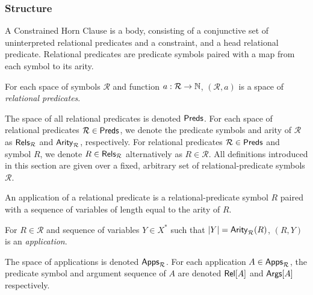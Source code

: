 \subsubsection{Structure}
A Constrained Horn Clause is a body, consisting of a conjunctive set
of uninterpreted relational predicates and a constraint, and a head
relational predicate.
%
Relational predicates are predicate symbols paired with a map from
each symbol to its arity.
%
\begin{defn}
  \label{defn:rel-preds}
  For each space of symbols $\mathcal{R}$ and function $a: \mathcal{R}
  \to \mathbb{N}$, $(\mathcal{R}, a)$ is a space of \emph{relational
    predicates}.
\end{defn}
%
The space of all relational predicates is denoted $\mathsf{Preds}$.
%
For each space of relational predicates $\mathcal{R} \in \mathsf{Preds}$,
we denote the predicate symbols and arity of $\mathcal{R}$ as
$\mathsf{Rels}_{\mathcal{R}}$ and $\mathsf{Arity}_{\mathcal{R}}$, respectively.
%
For relational predicates $\mathcal{R} \in \mathsf{Preds}$ and symbol $R$,
we denote $R \in \mathsf{Rels}_{ \mathcal{R} }$ alternatively as $R \in
\mathcal{R}$.
%
All definitions introduced in this section are given over a fixed,
arbitrary set of relational-predicate symbols $\mathcal{R}$.

An application of a relational predicate is a relational-predicate
symbol $R$ paired with a sequence of variables of length equal to the
arity of $R$.
%
\begin{defn}
  \label{defn:pred-apps}
  For $R \in \mathcal{R}$ and sequence of variables $Y \in X^{*}$ such
  that $|Y| = \mathsf{Arity}_{\mathcal{R}}(R)$, $(R, Y)$ is an
  \emph{application}.
\end{defn}
%
The space of applications is denoted $\mathsf{Apps}_{\mathcal{R}}$.
%
For each application $A \in \mathsf{Apps}_{\mathcal{R}}$, the predicate symbol
and argument sequence of $A$ are denoted $\mathsf{Rel}[ A ]$ and $\mathsf{Args}[ A ]$
respectively.


